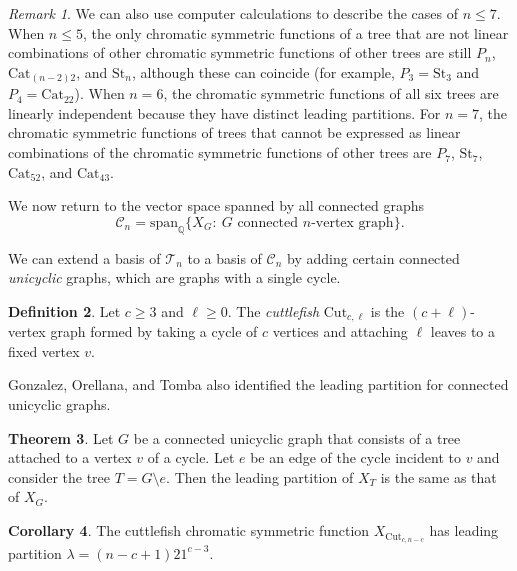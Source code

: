 \documentclass[12pt]{amsart}  %
\theoremstyle{definition}
\newtheorem{theorem}{Theorem}[section]
\newtheorem{corollary}[theorem]{Corollary}
\newtheorem{definition}[theorem]{Definition}
\theoremstyle{remark}
\newtheorem{remark}[theorem]{Remark}
\numberwithin{equation}{section}
\begin{document}
\begin{remark}
We can also use computer calculations to describe the cases of $n\leq 7$. When $n\leq 5$, the only chromatic symmetric functions of a tree that are not linear combinations of other chromatic symmetric functions of other trees are still $P_n$, $\text{Cat}_{(n-2)2}$, and $\text{St}_n$, although these can coincide (for example, $P_3=\text{St}_3$ and $P_4=\text{Cat}_{22}$). When $n=6$, the chromatic symmetric functions of all six trees are linearly independent because they have distinct leading partitions. For $n=7$, the chromatic symmetric functions of trees that cannot be expressed as linear combinations of the chromatic symmetric functions of other trees are $P_7$, $\text{St}_7$, $\text{Cat}_{52}$, and $\text{Cat}_{43}$.  
\end{remark}


We now return to the vector space spanned by all connected graphs
\begin{equation}
\mathcal C_n=\text{span}_{\mathbb Q}\{X_G: \ G\text{ connected }n\text{-vertex graph}\}.
\end{equation}

We can extend a basis of $\mathcal T_n$ to a basis of $\mathcal C_n$ by adding certain connected \emph{unicyclic} graphs, which are graphs with a single cycle. 

\begin{definition}
Let $c\geq 3$ and $\ell\geq 0$. The \emph{cuttlefish} $\text{Cut}_{c,\ell}$ is the $(c+\ell)$-vertex graph formed by taking a cycle of $c$ vertices and attaching $\ell$ leaves to a fixed vertex $v$.
\end{definition}

Gonzalez, Orellana, and Tomba also identified the leading partition for connected unicyclic graphs.

\begin{theorem}\cite[Theorem 5.6]{chromunicyclic} 
Let $G$ be a connected unicyclic graph that consists of a tree attached to a vertex $v$ of a cycle. Let $e$ be an edge of the cycle incident to $v$ and consider the tree $T=G\setminus e$. Then the leading partition of $X_T$ is the same as that of $X_G$.
\end{theorem}

\begin{corollary}\label{cor:cutleading}
The cuttlefish chromatic symmetric function $X_{\text{Cut}_{c,n-c}}$ has leading partition $\lambda=(n-c+1)21^{c-3}$.
\end{corollary}
\end{document}

